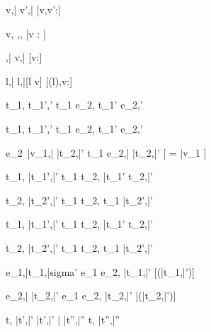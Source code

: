 

  { }
  {\Edit v,\bar{\sigma}  \Edit v',\bar{\sigma}}
  [v,v':\tau]

  { }
  {\Edit v,\sigma \handle{\Empty} \Enter \tau,\sigma,\True}
  [v : \tau]

  { }
  {\Enter \tau,\bar{\sigma}  \Edit v,\bar{\sigma}}
  [v:\tau]

  { }
  {\Update l,\bar{\sigma}  \Update l,\bar{\sigma}[l \mapsto v]}
  [\sigma(l),v:\tau]

  {t_1,\sigma {} t_1',\sigma'}
  {t_1 \Then e_2,\sigma {} t_1' \Then e_2,\sigma'}

  {t_1,\sigma {} t_1',\sigma'}
  {t_1 \Next e_2,\sigma {} t_1' \Next e_2,\sigma'}

  {e_2\ \bar{v_1},\sigma \bar{\normalise} \bar{t_2},\bar{\sigma'}}
  {t_1 \Next e_2,\sigma \bar{\handle{\Continue}} \bar{t_2},\bar{\sigma'}}
  [ = \bar{v_1} \land \neg{}]


  {t_1,\sigma {} \bar{t_1'},\bar{\sigma'}}
  {t_1 \And t_2,\sigma {} \bar{t_1'} \And t_2,\bar{\sigma'}}

  {t_2,\sigma {} \bar{t_2'},\bar{\sigma'}}
  {t_1 \And t_2,\sigma {} t_1 \And \bar{t_2'},\bar{\sigma'}}


  {t_1,\sigma {} \bar{t_1'},\bar{\sigma'}}
  {t_1 \Or t_2,\sigma {} \bar{t_1'} \Or t_2,\bar{\sigma'}}

  {t_2,\sigma {} \bar{t_2'},\bar{\sigma'} }
  {t_1 \Or t_2,\sigma {} t_1 \Or \bar{t_2'},\bar{\sigma'}}


  {e_1,\sigma \normalise \bar{t_1},\bar{sigma'}}
  {e_1 \Xor e_2,\sigma \xrightarrow[]{\Left} \bar{t_1},\bar{\sigma'}}
  [\neg\Failing(\bar{t_1},\bar{\sigma'})]

  {e_2,\sigma \bar{\normalise} \bar{t_2},\bar{\sigma'}}
  {e_1 \Xor e_2,\sigma \xrightarrow[]{\Right} \bar{t_2},\bar{\sigma'}}
  [\neg\Failing(\bar{t_2},\bar{\sigma'})]





  {t,\sigma {} \bar{t'},\bar{\sigma'} \Quad
   \bar{t'},\bar{\sigma'} \bar{\normalise} \bar{t''},\bar{\sigma''}}
  {t,\sigma {} \bar{t''},\bar{\sigma''}}
